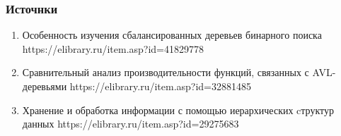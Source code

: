 \begin{frame}
    \frametitle{Источнки}

    \begin{enumerate}
    \item Особенность изучения сбалансированных деревьев бинарного поиска
    https://elibrary.ru/item.asp?id=41829778

    \item Сравнительный анализ производительности функций, связанных с AVL-деревьями
    https://elibrary.ru/item.asp?id=32881485

    \item Хранение и обработка информации с помощью иерархических cтруктур данных
    https://elibrary.ru/item.asp?id=29275683

    \end{enumerate}

\end{frame}